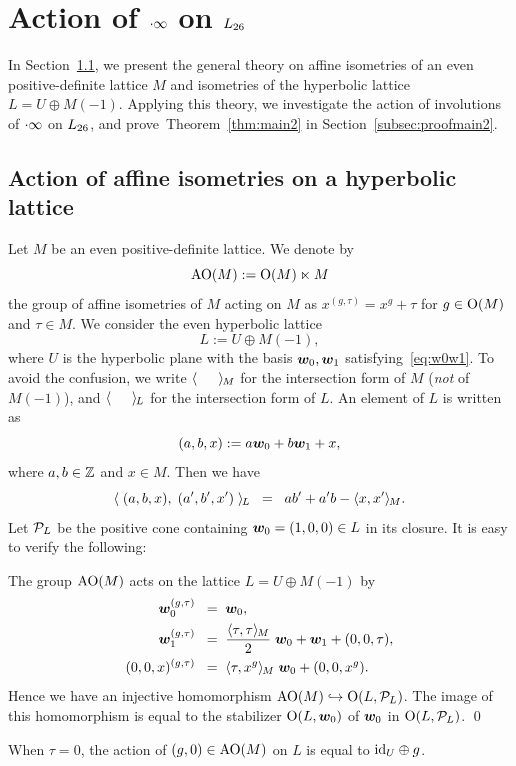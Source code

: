 \documentclass{amsart} %
\begin{document}
\section{Action of $\cdot \infty$ on $L_{26}$}\label{sec:proofThm2}
%
In Section~\ref{subsec:AOGM}, 
we present the general theory on affine isometries of an even positive-definite lattice $M$
and isometries of the hyperbolic lattice $L=U\oplus M(-1)$.
Applying this theory,
we investigate the action of involutions of $\cdot \infty$ on $L_{26}$,
and prove~Theorem~\ref{thm:main2} in Section~\ref{subsec:proofmain2}.
%
%
\subsection{Action of affine isometries on a hyperbolic lattice}\label{subsec:AOGM}
%
Let $M$ be an even positive-definite lattice.
We denote by 
\[
\mathord{\mathrm{AO}}(M):=\mathord{\mathrm{O}}(M)\ltimes M
\]
 the group of affine isometries of $M$
acting on $M$ as $x^{(g, \tau)}=x^g+\tau$
for $g\in \mathord{\mathrm{O}}(M)$ and $\tau\in M$.
We consider the even hyperbolic lattice
\[
L:=U\oplus M(-1),
\]
where $U$ is the hyperbolic plane with the basis $\boldsymbol{w}_0, \boldsymbol{w}_1$
satisfying~\eqref{eq:w0w1}.
To avoid the confusion, we write $\langle \phantom{a,a} \rangle_{\hskip -1pt M}$
for the intersection form of $M$ (\emph{not} of $M(-1)$),
and $\langle \phantom{a,a} \rangle_{\hskip -1pt L}$
for the intersection form of $L$.
An element of $L$ is written as 
\[
(a, b, x):=a\boldsymbol{w}_0+b \boldsymbol{w}_1+ x,
\]
where $a, b\in \mathord{\mathbb{Z}}$ and $x\in M$.
Then we have
\[
\langle \; (a, b, x), \; (a^{\prime}, b^{\prime}, x^{\prime})\; \rangle_{\hskip -1pt L}\;\;=\;\; ab^{\prime}+a^{\prime} b-\langle x, x^{\prime} \rangle_{\hskip -1pt M}.
\]
Let $\mathord{\mathcal{P}}_L$ be the positive cone containing 
$\boldsymbol{w}_0=(1,0, 0)\in L$ in its closure.
It is easy to verify the following:
%
\begin{proposition}\label{prop:embeddingAOG}
The group $\mathord{\mathrm{AO}}(M)$ acts on the lattice $L=U\oplus M(-1)$
by
%
\begin{align*}
\boldsymbol{w}_0^{(g, \tau)} \;\;=\;\; & \boldsymbol{w}_0, \\
\boldsymbol{w}_1^{(g, \tau)} \;\;=\;\; & \frac{\langle \tau, \tau \rangle_{\hskip -1pt M}}{2}\;\boldsymbol{w}_0+\boldsymbol{w}_1+(0,0,\tau), \\
(0,0,x)^{(g, \tau)} \;\;=\;\; &\langle \tau, x^g \rangle_{\hskip -1pt M} \;\boldsymbol{w}_0 + (0,0, x^g).
\end{align*}
Hence we have an injective homomorphism $\mathord{\mathrm{AO}}(M)\hookrightarrow \mathord{\mathrm{O}}(L, \mathord{\mathcal{P}}_L)$.
The image of this homomorphism is equal to
the stabilizer $\mathord{\mathrm{O}}(L, \boldsymbol{w}_0)$ of $\boldsymbol{w}_0$ in $\mathord{\mathrm{O}}(L, \mathord{\mathcal{P}}_L)$.
\qed
%
\end{proposition}
%
\begin{remark}\label{rem:tau0}
When $\tau=0$, the action of $(g, 0)\in \mathord{\mathrm{AO}}(M)$ on $L$ 
is equal to $\mathord{\mathrm{id}}_U\oplus g$.
\end{remark}
\end{document}
